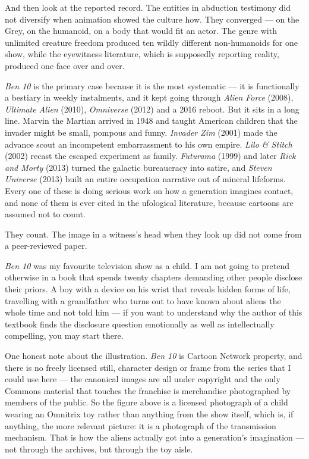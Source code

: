 And then look at the reported record. The entities in abduction testimony did not diversify when
animation showed the culture how. They converged --- on the Grey, on the humanoid, on a body that
would fit an actor. The genre with unlimited creature freedom produced ten wildly different
non-humanoids for one show, while the eyewitness literature, which is supposedly reporting reality,
produced one face over and over. 

\emph{Ben 10} is the primary case because it is the most systematic --- it is functionally a
bestiary in weekly instalments, and it kept going through \emph{Alien Force} (2008),
\emph{Ultimate Alien} (2010), \emph{Omniverse} (2012) and a 2016 reboot. But it sits in a long line.
Marvin the Martian arrived in 1948 and taught American children that the invader might be small,
pompous and funny. \emph{Invader Zim} (2001) made the advance scout an incompetent embarrassment to
his own empire. \emph{Lilo \& Stitch} (2002) recast the escaped experiment as family.
\emph{Futurama} (1999) and later \emph{Rick and Morty} (2013) turned the galactic bureaucracy into
satire, and \emph{Steven Universe} (2013) built an entire occupation narrative out of mineral
lifeforms. Every one of these is doing serious work on how a generation imagines contact, and none of
them is ever cited in the ufological literature, because cartoons are assumed not to count.

They count. The image in a witness's head when they look up did not come from a peer-reviewed paper.

\begin{funfact}
\emph{Ben 10} was my favourite television show as a child. I am not going to pretend otherwise in a
book that spends twenty chapters demanding other people disclose their priors. A boy with a device on
his wrist that reveals hidden forms of life, travelling with a grandfather who turns out to have known
about aliens the whole time and not told him --- if you want to understand why the author of this
textbook finds the disclosure question emotionally as well as intellectually compelling, you may start
there.
\end{funfact}

One honest note about the illustration. \emph{Ben 10} is Cartoon Network property, and there is no
freely licensed still, character design or frame from the series that I could use here --- the
canonical images are all under copyright and the only Commons material that touches the franchise is
merchandise photographed by members of the public. So the figure above is a licensed photograph of a
child wearing an Omnitrix toy rather than anything from the show itself, which is, if anything, the
more relevant picture: it is a photograph of the transmission mechanism. That is how the aliens
actually got into a generation's imagination --- not through the archives, but through the toy aisle.

